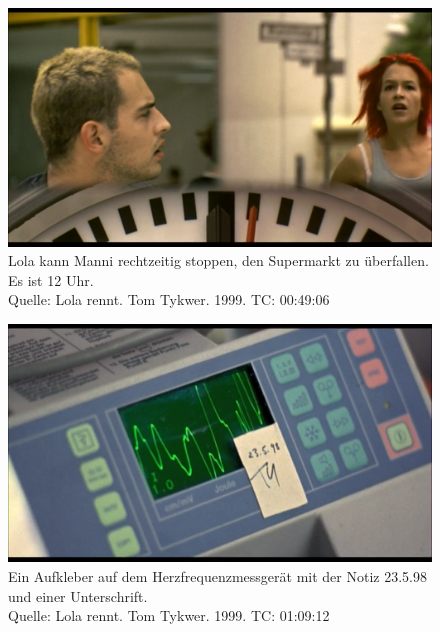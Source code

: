 \begin{appendix}
\begin{figure}[htbp]
	\centering
		\includegraphics[width=1.00\textwidth]{img/12Uhr.png}
	\caption[12 Uhr]{Lola kann Manni rechtzeitig stoppen, den Supermarkt zu überfallen. Es ist 12 Uhr. \\Quelle: Lola rennt. Tom Tykwer. 1999. TC: 00:49:06}
	\label{fig:12Uhr}
\end{figure}

\begin{figure}[htbp]
	\centering
		\includegraphics[width=1.00\textwidth]{img/Herzfrequenzmessgeraet.png}
	\caption[Das Herzfrequenzmessgerät]{Ein Aufkleber auf dem Herzfrequenzmessgerät mit der Notiz 23.5.98 und einer Unterschrift. \\Quelle: Lola rennt. Tom Tykwer. 1999. TC: 01:09:12}
	\label{fig:Herzfrequenzmessgeraet}
\end{figure}


\end{appendix} 


\mbox{}
\newpage




\setcounter{secnumdepth}{0} %

